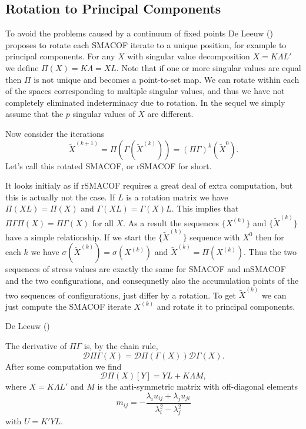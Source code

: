 \documentclass[
  12pt,
  letterpaper,
  DIV=11,
  numbers=noendperiod]{scrartcl}
\begin{document}
\subsection{Rotation to Principal
Components}\label{rotation-to-principal-components}

To avoid the problems caused by a continuum of fixed points De Leeuw
() proposes to rotate each SMACOF
iterate to a unique position, for example to principal components. For
any \(X\) with singular value decomposition \(X=K\Lambda L'\) we define
\(\Pi(X)=K\Lambda=XL.\) Note that if one or more singular values are
equal then \(\Pi\) is not unique and becomes a point-to-set map. We can
rotate within each of the spaces corresponding to multiple singular
values, and thus we have not completely eliminated indeterminacy due to
rotation. In the sequel we simply assume that the \(p\) singular values
of \(X\) are different.

Now consider the iterations \begin{equation}
\tilde X^{(k+1)}=\Pi(\Gamma(\tilde X^{(k)}))={(\Pi\Gamma)}^k(\tilde X^{0}).
\end{equation} Let's call this rotated SMACOF, or rSMACOF for short.

It looks initialy as if rSMACOF requires a great deal of extra
computation, but this is actually not the case. If \(L\) is a rotation
matrix we have \(\Pi(XL)=\Pi(X)\) and \(\Gamma(XL)=\Gamma(X)L\). This
implies that \(\Pi\Gamma\Pi(X)=\Pi\Gamma(X)\) for all \(X\). As a result
the sequences \(\{X^{(k)}\}\) and \(\{\tilde X^{(k)}\}\) have a simple
relationship. If we start the \(\{\tilde X^{(k)}\}\) sequence with
\(X^{0}\) then for each \(k\) we have
\(\sigma(\tilde X^{(k)})=\sigma(X^{(k)})\) and
\(\tilde X^{(k)}=\Pi(X^{(k)})\). Thus the two sequences of stress values
are exactly the same for SMACOF and mSMACOF and the two configurations,
and consequnetly also the accumulation points of the two sequences of
configurations, just differ by a rotation. To get \(\tilde X^{(k)}\) we
can just compute the SMACOF iterate \(X^{(k)}\) and rotate it to
principal components.

De Leeuw ()

The derivative of \(\Pi\Gamma\) is, by the chain rule, \begin{equation}
\mathcal{D}\Pi\Gamma(X)=\mathcal{D}\Pi(\Gamma(X))\mathcal{D}\Gamma(X).
\end{equation} After some computation we find \begin{equation}
\mathcal{D}\Pi(X)[Y]=YL+K\Lambda M,
\end{equation} where \(X=K\Lambda L'\) and \(M\) is the anti-symmetric
matrix with off-diagonal elements \begin{equation}
m_{ij}=-\frac{\lambda_iu_{ij}+\lambda_ju_{ji}}{\lambda_i^2-\lambda_j^2}
\end{equation} with \(U=K'YL\).
\end{document}
